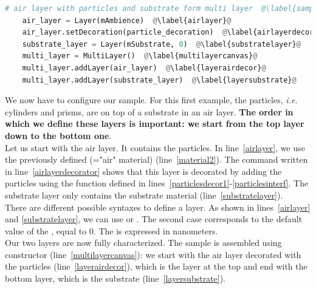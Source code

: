 \begin{lstlisting}[language=python, style=eclipseboxed,name=ex1,nolol]
    # air layer with particles and substrate form multi layer  @\label{sampleassembling}@
    air_layer = Layer(mAmbience)  @\label{airlayer}@
    air_layer.setDecoration(particle_decoration)  @\label{airlayerdecorator}@
    substrate_layer = Layer(mSubstrate, 0)  @\label{substratelayer}@
    multi_layer = MultiLayer()  @\label{multilayercanvas}@
    multi_layer.addLayer(air_layer)  @\label{layerairdecor}@
    multi_layer.addLayer(substrate_layer)  @\label{layersubstrate}@
\end{lstlisting}

\noindent We now have to configure our sample. For this first example,
the particles, \textit{i.e.} cylinders and prisms, are on top of a substrate in an
air layer. \textbf{The order in which we define these layers is important: we
start from the top layer down to the bottom one}.\\

\noindent Let us start with the air layer. It contains the particles. In
line~\ref{airlayer}, we use the previously defined 
(="air" material) (line~\ref{material2}). The command written in line~\ref{airlayerdecorator} shows that this layer is decorated by adding the
particles using the function  defined in
lines~\ref{particlesdecor1}-\ref{particlesinterf}. The substrate layer
only contains the substrate material (line~\ref{substratelayer}).\\%
 
\noindent There are different possible syntaxes to define a layer. As shown in
lines~\ref{airlayer} and \ref{substratelayer}, we can use
 or
. The second case corresponds
to the default value of the , equal to 0. The  is
expressed in  nanometers. \\

\noindent Our two layers are now fully characterized. The sample is assembled using
 constructor (line~\ref{multilayercanvas}): we start with the air layer decorated
with the particles (line~\ref{layerairdecor}), which is the layer at
the top and end with the bottom layer, which is the
substrate (line~\ref{layersubstrate}).


